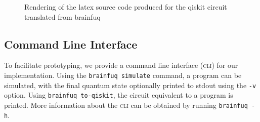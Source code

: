 \begin{figure}[htbp]
\centering
{}
\caption{Rendering of the latex source code produced for the qiskit circuit translated from brainfuq}
\label{fig:ghz_circuit}
\end{figure}

\subsection{Command Line Interface}
\label{sec:cli}

To facilitate prototyping, we provide a command line interface (\textsc{cli}) for our implementation. Using the \texttt{brainfuq simulate} command, a \bfq{} program can be simulated, with the final quantum state optionally printed to stdout using the \texttt{-v} option. Using \texttt{brainfuq to-qiskit}, the \qiskit{} circuit equivalent to a \bfq{} program is printed. More information about the \textsc{cli} can be obtained by running \texttt{brainfuq -h}.